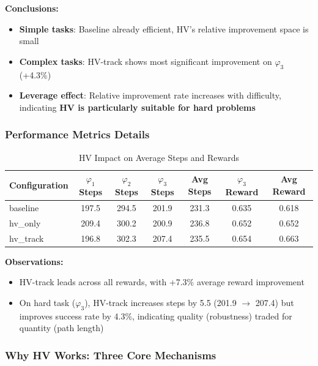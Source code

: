\documentclass[conference]{IEEEtran}
\begin{document}
\textbf{Conclusions:}
\begin{itemize}
    \item \textbf{Simple tasks}: Baseline already efficient, HV's relative improvement space is small
    \item \textbf{Complex tasks}: HV-track shows most significant improvement on $\varphi_3$ (+4.3\%)
    \item \textbf{Leverage effect}: Relative improvement rate increases with difficulty, indicating \textbf{HV is particularly suitable for hard problems}
\end{itemize}

\subsubsection{Performance Metrics Details}

\begin{table}[t]
\centering
\caption{HV Impact on Average Steps and Rewards}
\label{tab:hv_steps_rewards}
\begin{tabular}{@{}lcccccc@{}}
\toprule
\textbf{Configuration} & \textbf{$\varphi_1$ Steps} & \textbf{$\varphi_2$ Steps} & \textbf{$\varphi_3$ Steps} & \textbf{Avg Steps} & \textbf{$\varphi_3$ Reward} & \textbf{Avg Reward} \\ \midrule
baseline & 197.5 & 294.5 & 201.9 & 231.3 & 0.635 & 0.618 \\
hv\_only & 209.4 & 300.2 & 200.9 & 236.8 & 0.652 & 0.652 \\
hv\_track & 196.8 & 302.3 & 207.4 & 235.5 & 0.654 & 0.663 \\ \bottomrule
\end{tabular}
\end{table}

\textbf{Observations:}
\begin{itemize}
    \item HV-track leads across all rewards, with +7.3\% average reward improvement
    \item On hard task ($\varphi_3$), HV-track increases steps by 5.5 (201.9 $\rightarrow$ 207.4) but improves success rate by 4.3\%, indicating quality (robustness) traded for quantity (path length)
\end{itemize}

\subsubsection{Why HV Works: Three Core Mechanisms}
\end{document}
